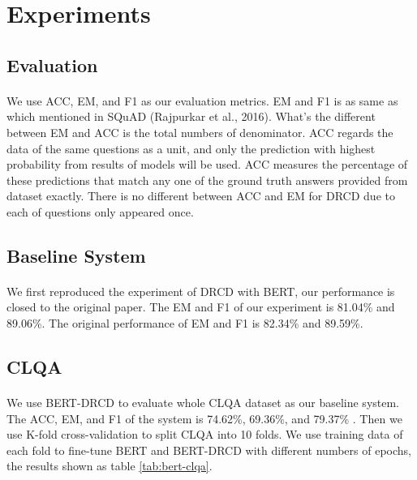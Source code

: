 \documentclass{article}
\begin{document}
\section{Experiments}
\paragraph{}

\subsection{Evaluation}
\paragraph{}
We use ACC, EM, and F1 as our evaluation metrics. EM and F1 is as same as which mentioned in SQuAD\cite{rajpurkar2016squad} (Rajpurkar et al., 2016). What's the different between EM and ACC is the total numbers of denominator. ACC regards the data of the same questions as a unit, and only the prediction with highest probability from results of models will be used. ACC measures the percentage of these predictions that match any one of the ground truth answers provided from dataset exactly. There is no different between ACC and EM for DRCD due to each of questions only appeared once.

\subsection{Baseline System}
\paragraph{}
We first reproduced the experiment of DRCD with BERT, our performance is closed to the original paper. The EM and F1 of our experiment is 81.04\% and 89.06\%. The original performance of EM and F1 is 82.34\% and 89.59\%.

\subsection{CLQA}
\paragraph{}
We use BERT-DRCD to evaluate whole CLQA dataset as our baseline system. The ACC, EM, and F1 of the system is 74.62\%, 69.36\%, and 79.37\% . Then we use K-fold cross-validation to split CLQA into 10 folds. We use training data of each fold to fine-tune BERT and BERT-DRCD with different numbers of epochs, the results shown as table \ref{tab:bert-clqa}.
\end{document}

